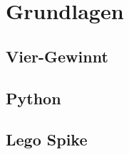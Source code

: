 \chapter{Grundlagen}
\label{cha:Grundlagen}
%
%

\section{Vier-Gewinnt}

\section{Python}
\section{Lego Spike}


